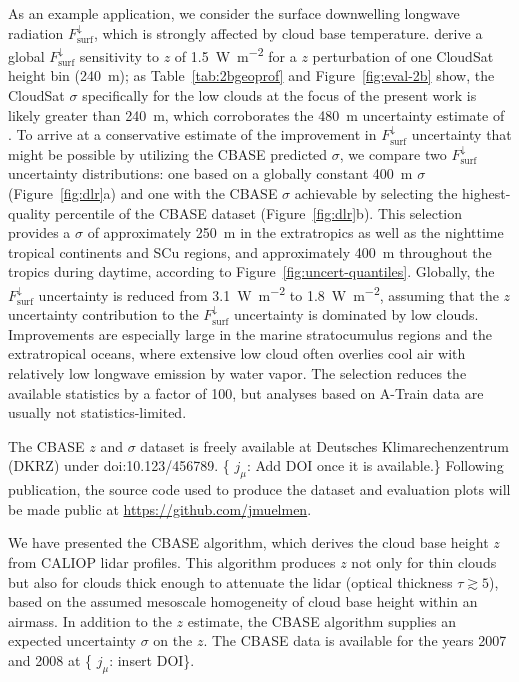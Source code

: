 \documentclass[essd,manuscript]{copernicus}\usepackage[]{graphicx}\usepackage[]{color}
\newcommand{\hlnum}[1]{\textcolor[rgb]{0.686,0.059,0.569}{#1}}%
\newcommand\comment[2]{\{\hlnum{ \textit{#1}: #2}\}}
\newcommand\commentjm[1]{\comment{$j_\mu$}{#1}}
\newcommand\CBH{\ensuremath{z}}
\newcommand\DLR{\ensuremath{F_\text{surf}^\downarrow}}
\begin{document}
As an example application, we consider the surface downwelling longwave
radiation \DLR{}, which is strongly affected by cloud base temperature.
\cite{Henderson2013} derive a global \DLR{} sensitivity to \CBH{} of
1.5~\unit{W~m^{-2}} for a \CBH{} perturbation of one CloudSat height bin
(240~\unit{m}); as Table~\ref{tab:2bgeoprof} and Figure~\ref{fig:eval-2b} show,
the CloudSat $\sigma$ specifically for the low clouds at the focus of the
present work is likely greater than 240~\unit{m}, which corroborates the
480~\unit{m} uncertainty estimate of \cite{Kato2011}. To arrive at a
conservative estimate of the improvement in \DLR{} uncertainty that might be
possible by utilizing the CBASE predicted $\sigma$, we compare two \DLR{}
uncertainty distributions: one based on a globally constant 400~\unit{m} $\sigma$
(Figure~\ref{fig:dlr}a) and one with the CBASE $\sigma$ achievable by selecting
the highest-quality percentile of the CBASE dataset
(Figure~\ref{fig:dlr}b). This selection provides a $\sigma$ of approximately
250~\unit{m} in the extratropics as well as the nighttime tropical continents
and SCu regions, and approximately 400~\unit{m} throughout the tropics during
daytime, according to Figure~\ref{fig:uncert-quantiles}.  Globally, the \DLR{}
uncertainty is reduced from 3.1~\unit{W~m^{-2}} to 1.8~\unit{W~m^{-2}}, assuming
that the \CBH{} uncertainty contribution to the \DLR{} uncertainty is dominated
by low clouds.  Improvements are especially large in the marine stratocumulus
regions and the extratropical oceans, where extensive low cloud often overlies
cool air with relatively low longwave emission by water vapor. The selection
reduces the available statistics by a factor of 100, but analyses based on
A-Train data are usually not statistics-limited.

The CBASE \CBH{} and $\sigma$ dataset \citep{cbase} is freely available at
Deutsches Klimarechenzentrum (DKRZ) under doi:10.123/456789.  \commentjm{Add DOI
once it is available.}  Following publication, the source code used to produce
the dataset and evaluation plots will be made public at
\url{https://github.com/jmuelmen}. 

\conclusions
\label{sec:conclusions}

We have presented the CBASE algorithm, which derives the cloud base height \CBH{} from CALIOP lidar
profiles.  This algorithm produces \CBH{} not only for thin clouds but also for
clouds thick enough to attenuate the lidar (optical thickness $\tau \gtrsim 5$),
based on the assumed mesoscale homogeneity of cloud base height within an
airmass.  In addition to the \CBH{} estimate, the CBASE algorithm supplies an
expected uncertainty $\sigma$ on the \CBH{}.  The CBASE data is available for the years 2007
and 2008 at \commentjm{insert DOI}.
\end{document}
